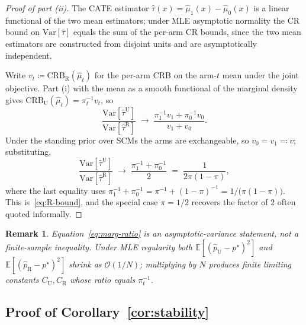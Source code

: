 \documentclass[11pt]{article}
\newtheorem{remark}[theorem]{Remark}
\newcommand{\EE}{\mathbb{E}}
\newcommand{\Var}{\mathrm{Var}}
\begin{document}
\begin{proof}[Proof of part (ii)]
The CATE estimator $\hat{\tau}(x) = \hat{\mu}_{1}(x) - \hat{\mu}_{0}(x)$
is a linear functional of the two mean estimators; under MLE
asymptotic normality the CR bound on $\Var[\hat{\tau}]$ equals the
sum of the per-arm CR bounds, since the two mean estimators are
constructed from disjoint units and are asymptotically independent.

Write $v_{t} \coloneqq \mathrm{CRB}_{\mathrm{R}}(\hat{\mu}_{t})$ for
the per-arm CRB on the arm-$t$ mean under the joint objective. Part
(i) with the mean as a smooth functional of the marginal density
gives $\mathrm{CRB}_{\mathrm{U}}(\hat{\mu}_{t}) = \pi_{t}^{-1} v_{t}$,
so
\begin{equation*}
  \frac{\Var[\hat{\tau}^{\mathrm{U}}]}
       {\Var[\hat{\tau}^{\mathrm{R}}]}
  \;\longrightarrow\;
  \frac{\pi_{1}^{-1} v_{1} + \pi_{0}^{-1} v_{0}}
       {v_{1} + v_{0}}.
\end{equation*}
Under the standing prior over SCMs the arms are exchangeable, so
$v_{0} = v_{1} \eqqcolon v$; substituting,
\begin{equation*}
  \frac{\Var[\hat{\tau}^{\mathrm{U}}]}
       {\Var[\hat{\tau}^{\mathrm{R}}]}
  \;\longrightarrow\;
  \frac{\pi_{1}^{-1} + \pi_{0}^{-1}}{2}
  \;=\;
  \frac{1}{2\pi(1 - \pi)},
\end{equation*}
where the last equality uses $\pi_{1}^{-1} + \pi_{0}^{-1} = \pi^{-1}
+ (1 - \pi)^{-1} = 1 / \bigl(\pi(1 - \pi)\bigr)$. This
is~\eqref{eq:R-bound}, and the special case $\pi = 1/2$ recovers the
factor of $2$ often quoted informally.
\end{proof}

\begin{remark}
\label{rem:asymptotic-variance}
Equation~\eqref{eq:marg-ratio} is an asymptotic-variance statement,
not a finite-sample inequality. Under MLE regularity both
$\EE[(\hat{p}_{\mathrm{U}} - p^{\star})^{2}]$ and
$\EE[(\hat{p}_{\mathrm{R}} - p^{\star})^{2}]$ shrink as $\mathcal{O}(1
/ N)$; multiplying by $N$ produces finite limiting constants
$C_{\mathrm{U}}, C_{\mathrm{R}}$ whose ratio equals $\pi_{t}^{-1}$.
\end{remark}

\subsection{Proof of Corollary~\ref{cor:stability}}
\end{document}

